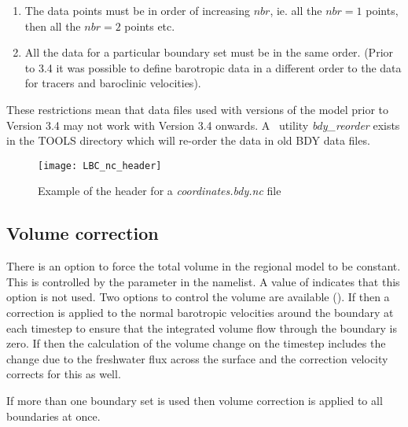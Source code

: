 \documentclass[../main/NEMO_manual]{subfiles}
\begin{document}
\begin{enumerate}
\item The data points must be in order of increasing $nbr$,
  ie. all the $nbr=1$ points, then all the $nbr=2$ points etc.
\item All the data for a particular boundary set must be in the same order.
  (Prior to 3.4 it was possible to define barotropic data in a different order to
  the data for tracers and baroclinic velocities).
\end{enumerate}

These restrictions mean that data files used with versions of the
model prior to Version 3.4 may not work with Version 3.4 onwards.
A \fortran\ utility {\itshape bdy\_reorder} exists in the TOOLS directory which
will re-order the data in old BDY data files.

\begin{figure}[!t]
  \centering
  \texttt{[image: LBC\_nc\_header]}
  \caption[Header for a \textit{coordinates.bdy.nc} file]{
    Example of the header for a \textit{coordinates.bdy.nc} file}
  \label{fig:LBC_nc_header}
\end{figure}

\subsection{Volume correction}
\label{subsec:LBC_bdy_vol_corr}

There is an option to force the total volume in the regional model to be constant.
This is controlled  by the  parameter in the namelist.
A value of  indicates that this option is not used.
Two options to control the volume are available ().
If  then a correction is applied to the normal barotropic velocities around the boundary at
each timestep to ensure that the integrated volume flow through the boundary is zero.
If  then the calculation of the volume change on
the timestep includes the change due to the freshwater flux across the surface and
the correction velocity corrects for this as well.

If more than one boundary set is used then volume correction is
applied to all boundaries at once.

\end{document}
